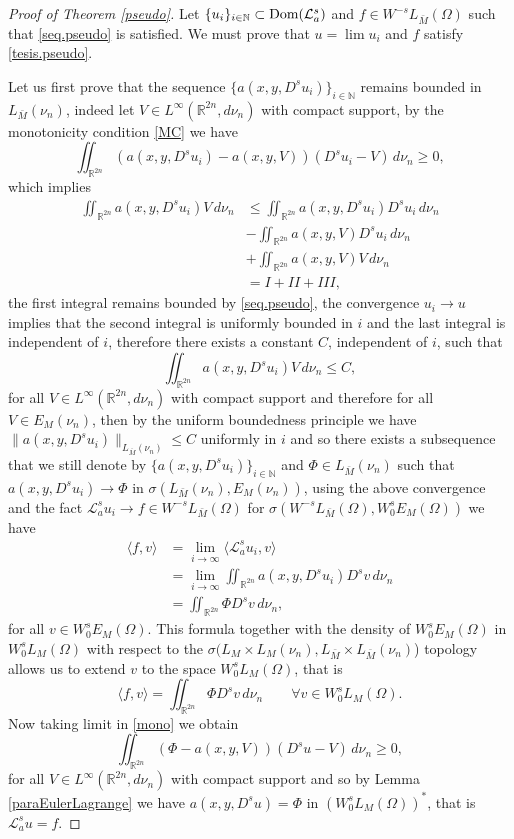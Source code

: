 \documentclass[10pt,a4paper]{amsart}
\def\Dom{\text{\normalfont Dom}}
\newcommand{\A}{\mathcal{L}_a^s}
\newcommand{\N}{{\mathbb N}}
\newcommand{\R}{{\mathbb R}}
\begin{document}
\begin{proof}[Proof of Theorem \ref{pseudo}]
Let $\{u_i\}_{i\in \N} \subset \Dom(\A)$ and $f\in  W^{-s}L_{\bar{M}}(\Omega)$ such that \eqref{seq.pseudo} is satisfied. 
We must prove that $u=\lim u_i$ and $f$ satisfy \eqref{tesis.pseudo}.


Let us first prove that the sequence $\{a(x,y,D^s u_i)\}_{i \in \N}$ remains bounded in $L_{\bar{M}}(\nu_n)$, indeed let $V \in L^{\infty}(\R^{2n},d\nu_n)$ with compact support, by the monotonicity condition \eqref{MC} we have 
\begin{equation}\label{mono}
\iint_{\R^{2n}} (a(x,y,D^s u_i)-a(x,y,V))(D^s u_i-V)\, d\nu_n\geq 0,
\end{equation}
which implies
\begin{align*}
\iint_{\R^{2n}} a(x,y,D^s u_i)V\,d\nu_n&\leq \iint_{\R^{2n}} a(x,y,D^s u_i)D^s u_i\,d\nu_n
\\
&-\iint_{\R^{2n}} a(x,y,V)D^s u_i\,d\nu_n
\\
&+\iint_{\R^{2n}} a(x,y,V)V\,d\nu_n
\\
&=I+II+III,
\end{align*}
the first integral remains bounded by \eqref{seq.pseudo}, the convergence $u_i\to u$ implies that the second integral is uniformly bounded in $i$ and the last integral is independent of $i$, therefore there exists a constant $C$, independent of $i$, such that
$$
\iint_{\R^{2n}} a(x,y,D^s u_i)V\,d\nu_n\leq C,
$$
for all $V\in L^{\infty}(\R^{2n},d\nu_n)$ with compact support and therefore for all $V\in E_M(\nu_n)$, then by the uniform boundedness principle we have $\|a(x,y,D^s u_i)\|_{L_{\bar{M}}(\nu_n)}\leq C$ uniformly in $i$ and so there exists a subsequence that we still denote by $\{a(x,y,D^s u_i)\}_{i\in \N}$ and   $\Phi\in L_{\bar{M}}(\nu_n)$ such that $a(x,y,D^su_i)\to \Phi$ in $\sigma(L_{\bar{M}}(\nu_n),E_M(\nu_n))$, using the above convergence and the fact $\A u_i \to f \in W^{-s}L_{\bar{M}}(\Omega)$ for $\sigma(W^{-s}L_{\bar{M}}(\Omega),W_0^sE_M(\Omega))$ we have
\begin{align*}
\langle f,v \rangle
&=\lim_{i\to\infty} \langle \A u_i,v\rangle
\\
&=\lim_{i\to\infty}\iint_{\R^{2n}}a(x,y,D^s u_i)D^sv\,d\nu_n
\\
&=\iint_{\R^{2n}}\Phi D^s v\,d\nu_n,
\end{align*}
for all $v\in W_0^sE_M(\Omega)$. This formula together with the density of $W_0^s
E_M(\Omega)$ in $W_0^s
L_M(\Omega)$ with respect to the $\sigma(L_M\times L_M(\nu_n),L_{\bar{M}}\times L_{\bar{M}}(\nu_n)$) topology allows us to extend $v$ to the space $W_0^sL_M(\Omega)$, that is
\begin{equation}\label{deff}
\langle f,v \rangle=\iint_{\R^{2n}}\Phi D^s v\,d\nu_n\qquad \forall v\in W_0^s L_M(\Omega).	
\end{equation}
Now taking limit in \eqref{mono} we obtain
$$
\iint_{\R^{2n}} (\Phi-a(x,y,V))(D^s u-V)\, d\nu_n\geq 0,
$$
for all $V\in L^{\infty}(\R^{2n},d\nu_n)$ with compact support and so by Lemma \ref{paraEulerLagrange} we have $a(x,y,D^s u)=\Phi$ in $(W_0^sL_M(\Omega))^*$, that is $\A u=f$.


\end{proof}
\end{document}
